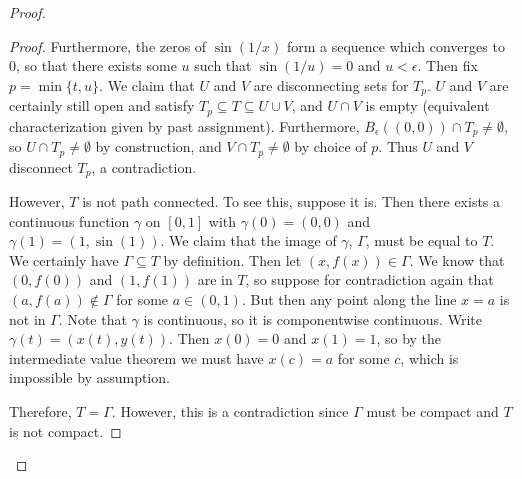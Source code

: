 \documentclass[12pt, a4paper]{book}
\theoremstyle{nonumberplain}
\newtheorem{proof}{Proof}
\begin{document}
\begin{proof}
\begin{proof}
    Furthermore, the zeros of $\sin(1/x)$ form a sequence which converges to 0, so that there exists some
    $u$ such that $\sin(1/u)=0$ and $u<\epsilon$. Then fix $p=\min\{t,u\}$. We claim that $U$ and $V$ are
    disconnecting sets for $T_p$. $U$ and $V$ are certainly still
    open and satisfy $T_p\subseteq T\subseteq U\cup V$, and $U\cap V$ is empty (equivalent characterization
    given by past assignment). Furthermore, $B_\epsilon\left( (0,0) \right)\cap T_p\neq\emptyset$,
    so $U\cap T_p\neq\emptyset$ by construction, and $V\cap T_p\neq\emptyset$ by choice of $p$. Thus $U$ and
    $V$ disconnect $T_p$, a contradiction.

    However, $T$ is not path connected. To see this, suppose it is. Then there exists a continuous function
    $\gamma$ on $[0,1]$ with $\gamma(0)=(0,0)$ and $\gamma(1)=(1,\sin(1))$. We claim that the image
    of $\gamma$, $\Gamma$, must be equal to $T$. We certainly have $\Gamma\subseteq T$ by definition. Then
    let $(x,f(x))\in\Gamma$. We know that $(0,f(0))$ and $(1,f(1))$ are in $T$, so suppose
    for contradiction again that $(a,f(a))\notin \Gamma$ for some $a\in(0,1)$. But then any point along the
    line $x=a$ is not in $\Gamma$. Note that $\gamma$ is continuous, so it is componentwise continuous. Write
    $\gamma(t) = (x(t),y(t))$. Then $x(0)=0$ and $x(1)=1$, so by the intermediate value theorem we must have
    $x(c)=a$ for some $c$, which is impossible by assumption.

    Therefore, $T=\Gamma$. However, this is a contradiction since $\Gamma$ must be compact and $T$ is not compact.
\end{proof}

\end{proof}
\end{document}
